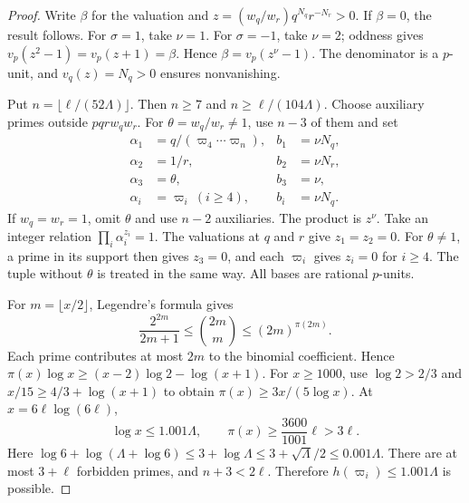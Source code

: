 \documentclass{amsart}
\theoremstyle{remark}
\numberwithin{equation}{section}
\begin{document}
\begin{proof}
Write $\beta$ for the valuation and $z=(w_q/w_r)q^{N_q}r^{-N_r}>0$.
If $\beta=0$, the result follows.
For $\sigma=1$, take $\nu=1$.
For $\sigma=-1$, take $\nu=2$; oddness gives
$v_p(z^2-1)=v_p(z+1)=\beta$.
Hence $\beta=v_p(z^\nu-1)$.
The denominator is a $p$-unit, and $v_q(z)=N_q>0$ ensures nonvanishing.

Put $n=\lfloor\ell/(52\Lambda)\rfloor$.
Then $n\ge7$ and $n\ge\ell/(104\Lambda)$.
Choose auxiliary primes outside $pqrw_qw_r$.
For $\theta=w_q/w_r\ne1$, use $n-3$ of them and set
\begin{equation}\label{eq:tuple}
\begin{aligned}
\alpha_1&=q/(\varpi_4\cdots \varpi_n),& b_1&=\nu N_q,\\
\alpha_2&=1/r,& b_2&=\nu N_r,\\
\alpha_3&=\theta,& b_3&=\nu,\\
\alpha_i&=\varpi_i\ (i\ge4),& b_i&=\nu N_q.
\end{aligned}
\end{equation}
If $w_q=w_r=1$, omit $\theta$ and use $n-2$ auxiliaries.
The product is $z^\nu$.
Take an integer relation $\prod_i\alpha_i^{z_i}=1$.
The valuations at $q$ and $r$ give $z_1=z_2=0$.
For $\theta\ne1$, a prime in its support then gives $z_3=0$,
and each $\varpi_i$ gives $z_i=0$ for $i\ge4$.
The tuple without $\theta$ is treated in the same way.
All bases are rational $p$-units.

For $m=\lfloor x/2\rfloor$, Legendre's formula gives
\[
\frac{2^{2m}}{2m+1}\le\binom{2m}m\le(2m)^{\pi(2m)}.
\]
Each prime contributes at most $2m$ to the binomial coefficient.
Hence $\pi(x)\log x\ge(x-2)\log2-\log(x+1)$.
For $x\ge1000$, use $\log2>2/3$ and
$x/15\ge4/3+\log(x+1)$ to obtain $\pi(x)\ge3x/(5\log x)$.
At $x=6\ell\log(6\ell)$,
\begin{equation}\label{eq:primesupply}
\log x\le1.001\Lambda,\qquad
\pi(x)\ge\frac{3600}{1001}\ell>3\ell.
\end{equation}
Here $\log6+\log(\Lambda+\log6)\le3+\log\Lambda
\le3+\sqrt\Lambda/2\le0.001\Lambda$.
There are at most $3+\ell$ forbidden primes, and $n+3<2\ell$.
Therefore $h(\varpi_i)\le1.001\Lambda$ is possible.


\end{proof}
\end{document}
